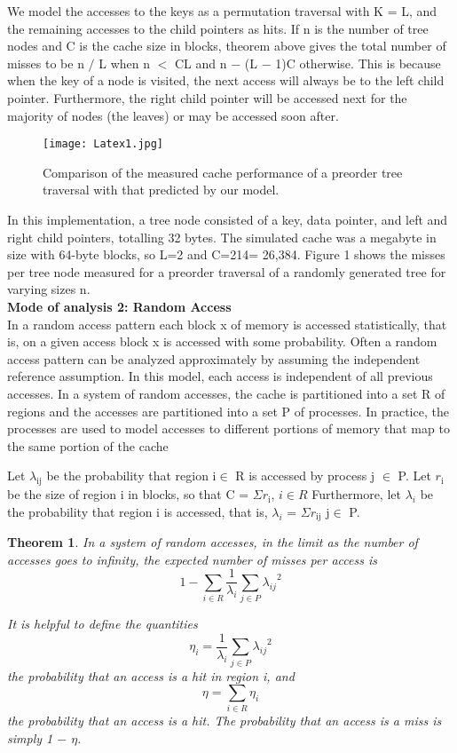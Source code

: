 \documentclass[14pt]{article}
\newtheorem{theorem}{Theorem}
\begin{document}
We model the accesses to the keys as a permutation traversal with K = L, and the remaining accesses to the child pointers as hits. If n is the number of tree nodes and C is the cache size in blocks, theorem above gives the total number of misses to be n $/$ L when n $<$ CL and n $-$ (L $-$ 1)C otherwise. This is because when the key of a node is visited, the next access will always be to the left child pointer. Furthermore, the right child pointer will be accessed next for the majority of nodes (the leaves) or may be accessed soon after.

\begin{figure}[H]
\centering
\texttt{[image: Latex1.jpg]}
\caption{Comparison of the measured cache performance of a preorder tree traversal with that predicted by our model. }\label{visina8}
\end{figure}

In this implementation, a tree node consisted of a key, data pointer, and left and right child pointers, totalling 32 bytes. The simulated cache was a megabyte in size with 64-byte blocks, so L=2 and C=214= 26,384. Figure 1 shows the misses per tree node measured for a preorder traversal of a randomly generated tree for varying sizes n. 
\\

\textbf{Mode of analysis 2: Random Access}\\
In a random access pattern each block x of memory is accessed statistically, that is, on a given access block x is accessed with some probability. Often a random access pattern can be analyzed approximately by assuming the independent reference assumption. In this model, each access is independent of all previous accesses.
In a system of random accesses, the cache is partitioned into a set R of regions and the accesses are partitioned into a set P of processes. In practice, the processes are used to model accesses to different portions of memory that map to the same portion of the cache

Let $\lambda_\mathrm{ij}$ be the probability that region i$\in$ R is accessed by process j $\in$ P. Let $r_\mathrm{i}$ be the size of region i in blocks, so that C = $\Sigma r_\mathrm{i}$, $i\in R$ Furthermore, let $\lambda_i$ be the probability that region i is accessed, that is, $\lambda_i$ = $\Sigma r_\mathrm{ij}$ j$\in$ P.

\begin{theorem}
In a system of random accesses, in the limit as the number of accesses goes to infinity, the expected number of misses per access is $$1 - \sum_{i\in R} \dfrac{1}{\lambda_i} \sum_{j\in P}{\lambda_{ij}}^2 $$

It is helpful to define the quantities 
$$\eta_i = \dfrac{1}{\lambda_i} \sum_{j\in P}{\lambda_{ij}}^2 $$
the probability that an access is a hit in region i, and 
$$\eta = \sum_{i\in R} \eta_i $$
the probability that an access is a hit. The probability
that an access is a miss is simply 1 $-$ $\eta$. 
\end{theorem}
\end{document}
